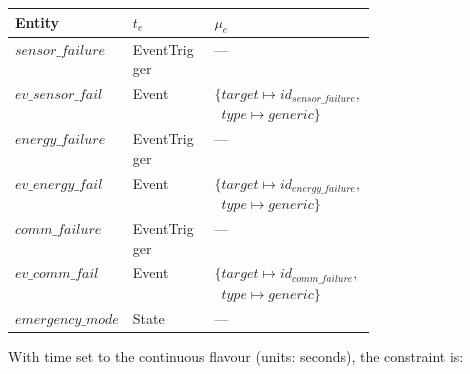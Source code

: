 {\footnotesize
\begin{center}
    \begin{tabular}{@{}l l p{0.42\linewidth}@{}}
        \toprule
        \textbf{Entity}             & $t_e$        & $\mu_e$   \\
        \midrule
        $\mathit{sensor\_failure}$  & EventTrigger & ---       \\
        $\mathit{ev\_sensor\_fail}$ & Event        &
        $\{\mathit{target} \mapsto id_{\mathit{sensor\_failure}},$\newline
        $\phantom{\{}\mathit{type} \mapsto \mathit{generic}\}$ \\
        $\mathit{energy\_failure}$  & EventTrigger & ---       \\
        $\mathit{ev\_energy\_fail}$ & Event        &
        $\{\mathit{target} \mapsto id_{\mathit{energy\_failure}},$\newline
        $\phantom{\{}\mathit{type} \mapsto \mathit{generic}\}$ \\
        $\mathit{comm\_failure}$    & EventTrigger & ---       \\
        $\mathit{ev\_comm\_fail}$   & Event        &
        $\{\mathit{target} \mapsto id_{\mathit{comm\_failure}},$\newline
        $\phantom{\{}\mathit{type} \mapsto \mathit{generic}\}$ \\
        $\mathit{emergency\_mode}$  & State        & ---       \\
        \bottomrule
    \end{tabular}
\end{center}
}

With time set to the continuous flavour (units: seconds), the constraint is:

